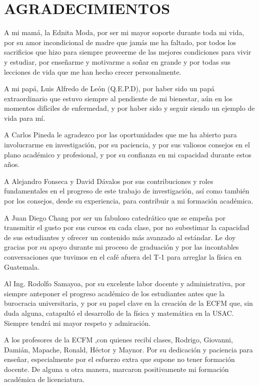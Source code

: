 \chapter*{AGRADECIMIENTOS}
\thispagestyle{empty}
A mi mamá, la Ednita Moda, por ser mi mayor soporte durante toda mi vida,
por su amor incondicional de madre que jamás me ha faltado,
por todos los sacrificios que hizo para siempre proveerme de 
las mejores condiciones para vivir y estudiar, por enseñarme y motivarme
a soñar en grande y por todas sus lecciones de vida que me han hecho
crecer personalmente.

A mi papá, Luis Alfredo de León (Q.E.P.D), por haber sido un papá extraordinario que 
estuvo siempre al pendiente de mi bienestar, aún en los momentos difíciles 
de enfermedad, y por haber sido y seguir siendo un ejemplo de vida para mí. 

A Carlos Pineda le agradezco por las oportunidades que me ha abierto para 
involucrarme en investigación, por su paciencia, y por sus valiosos consejos 
en el plano académico y profesional, y por su confianza en mi capacidad 
durante estos años.

A Alejandro Fonseca y David Dávalos por sus contribuciones y roles fundamentales
en el progreso de este trabajo de investigación, así como también por
los consejos, desde su experiencia, para contribuir a mi formación académica.

A Juan Diego Chang por ser un fabuloso catedrático que se empeña por transmitir
el gusto por sus cursos en cada clase, por no subestimar la capacidad de sus 
estudiantes y ofrecer un contenido más avanzado al estándar. 
Le doy gracias por su apoyo durante mi proceso de graduación
y por las incontables conversaciones que tuvimos en el café afuera del T-1
para arreglar la física en Guatemala.

Al Ing. Rodolfo Samayoa, por su excelente labor docente y administrativa, 
por siempre anteponer el progreso académico de los estudiantes antes que 
la burocracia universitaria, y por su papel clave en la creación de la ECFM
que, sin duda alguna, catapultó el desarrollo de la física y matemática en la USAC.
Siempre tendrá mi mayor respeto y admiración.

A los profesores de la ECFM ,con quienes recibí clases,
Rodrigo, Giovanni, Damián, Mapache, Ronald, Héctor y Maynor.
Por su dedicación y paciencia para enseñar, especialmente por 
el esfuerzo extra que supone no tener formación docente. 
De alguna u otra manera, marcaron positivamente mi formación 
académica de licenciatura.

